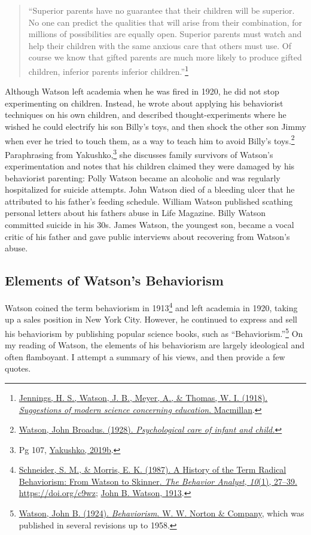 \documentclass[
  oneside,
  12pt]{crumpbook}
\begin{document}
\begin{quote}
``Superior parents have no guarantee that their children will be superior. No one can predict the qualities that will arise from their combination, for millions of possibilities are equally open. Superior parents must watch and help their children with the same anxious care that others must use. Of course we know that gifted parents are much more likely to produce gifted children, inferior parents inferior children.''\footnote{\protect\hyperlink{ref-jenningsSuggestionsModernScience1918}{Jennings, H. S., Watson, J. B., Meyer, A., \& Thomas, W. I. (1918). \emph{Suggestions of modern science concerning education}. {Macmillan}}.}
\end{quote}

Although Watson left academia when he was fired in 1920, he did not stop experimenting on children. Instead, he wrote about applying his behaviorist techniques on his own children, and described thought-experiments where he wished he could electrify his son Billy's toys, and then shock the other son Jimmy when ever he tried to touch them, as a way to teach him to avoid Billy's toys.\footnote{\protect\hyperlink{ref-watsonPsychologicalCareInfant1928}{Watson, John Broadus. (1928). \emph{Psychological care of infant and child.}}} Paraphrasing from Yakushko,\footnote{Pg 107, \protect\hyperlink{ref-yakushkoScientificPollyannaismInquisition2019}{Yakushko, 2019b}.} she discusses family survivors of Watson's experimentation and notes that his children claimed they were damaged by his behaviorist parenting: Polly Watson became an alcoholic and was regularly hospitalized for suicide attempts. John Watson died of a bleeding ulcer that he attributed to his father's feeding schedule. William Watson published scathing personal letters about his fathers abuse in Life Magazine. Billy Watson committed suicide in his 30s. James Watson, the youngest son, became a vocal critic of his father and gave public interviews about recovering from Watson's abuse.

\hypertarget{elements-of-watsons-behaviorism}{%
\subsection{Elements of Watson's Behaviorism}\label{elements-of-watsons-behaviorism}}

Watson coined the term behaviorism in 1913\footnote{\protect\hyperlink{ref-schneiderHistoryTermRadical1987}{Schneider, S. M., \& Morris, E. K. (1987). A {History} of the {Term Radical Behaviorism}: {From Watson} to {Skinner}. \emph{The Behavior Analyst}, \emph{10}(1), 27--39. \url{https://doi.org/c9wz}}; \protect\hyperlink{ref-watsonPsychologyBehavioristViews1913}{John B. Watson, 1913}.} and left academia in 1920, taking up a sales position in New York City. However, he continued to express and sell his behaviorism by publishing popular science books, such as ``Behaviorism.''\footnote{\protect\hyperlink{ref-watsonBehaviorism1924}{Watson, John B. (1924). \emph{Behaviorism}. {W. W. Norton \& Company}}, which was published in several revisions up to 1958.} On my reading of Watson, the elements of his behaviorism are largely ideological and often flamboyant. I attempt a summary of his views, and then provide a few quotes.
\end{document}
